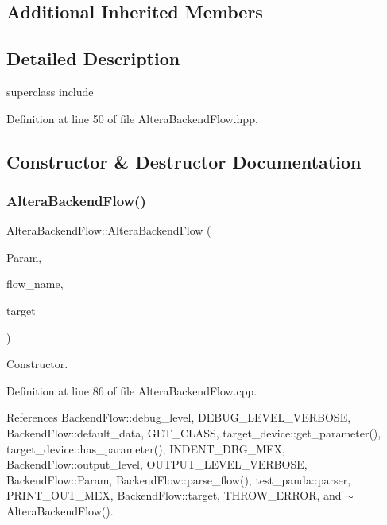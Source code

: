\subsection*{Additional Inherited Members}


\subsection{Detailed Description}
superclass include 

Definition at line 50 of file Altera\+Backend\+Flow.\+hpp.



\subsection{Constructor \& Destructor Documentation}
\mbox{\label{classAlteraBackendFlow_aeb3203a30034d5650f1dd14133887224}} 
\subsubsection{\texorpdfstring{Altera\+Backend\+Flow()}{AlteraBackendFlow()}}
{\footnotesize\ttfamily Altera\+Backend\+Flow\+::\+Altera\+Backend\+Flow (\begin{DoxyParamCaption}\item[{const \hyperlink{Parameter_8hpp_a37841774a6fcb479b597fdf8955eb4ea}{Parameter\+Const\+Ref}}]{Param,  }\item[{const std\+::string \&}]{flow\+\_\+name,  }\item[{const \hyperlink{target__manager_8hpp_aee0b586a84fb6eb4faefa6e41e1735a9}{target\+\_\+manager\+Ref}}]{target }\end{DoxyParamCaption})}



Constructor. 



Definition at line 86 of file Altera\+Backend\+Flow.\+cpp.



References Backend\+Flow\+::debug\+\_\+level, D\+E\+B\+U\+G\+\_\+\+L\+E\+V\+E\+L\+\_\+\+V\+E\+R\+B\+O\+SE, Backend\+Flow\+::default\+\_\+data, G\+E\+T\+\_\+\+C\+L\+A\+SS, target\+\_\+device\+::get\+\_\+parameter(), target\+\_\+device\+::has\+\_\+parameter(), I\+N\+D\+E\+N\+T\+\_\+\+D\+B\+G\+\_\+\+M\+EX, Backend\+Flow\+::output\+\_\+level, O\+U\+T\+P\+U\+T\+\_\+\+L\+E\+V\+E\+L\+\_\+\+V\+E\+R\+B\+O\+SE, Backend\+Flow\+::\+Param, Backend\+Flow\+::parse\+\_\+flow(), test\+\_\+panda\+::parser, P\+R\+I\+N\+T\+\_\+\+O\+U\+T\+\_\+\+M\+EX, Backend\+Flow\+::target, T\+H\+R\+O\+W\+\_\+\+E\+R\+R\+OR, and $\sim$\+Altera\+Backend\+Flow().

